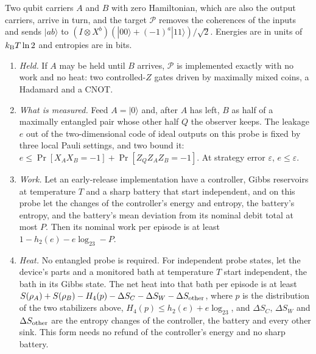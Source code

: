 \begin{proposition}\label{to:prop:certificate}
Two qubit carriers $A$ and $B$ with zero Hamiltonian, which are also the output carriers, arrive in turn, and the target $\mathcal P$ removes the coherences of the inputs and sends $|ab\rangle$ to $(I\otimes X^b)(|00\rangle+(-1)^a|11\rangle)/\sqrt2$. Energies are in units of $k_{\mathrm B} T\ln2$ and entropies are in bits.
\begin{enumerate}[label=(\alph*), leftmargin=*]
\item \emph{Held.} If $A$ may be held until $B$ arrives, $\mathcal P$ is implemented exactly with no work and no heat: two controlled-$Z$ gates driven by maximally mixed coins, a Hadamard and a CNOT.
\item \emph{What is measured.} Feed $A=|0\rangle$ and, after $A$ has left, $B$ as half of a maximally entangled pair whose other half $Q$ the observer keeps. The leakage $e$ out of the two-dimensional code of ideal outputs on this probe is fixed by three local Pauli settings, and two bound it: $e\le\Pr[X_AX_B=-1]+\Pr[Z_QZ_AZ_B=-1]$. At strategy error $\varepsilon$, $e\le\varepsilon$.
\item \emph{Work.} Let an early-release implementation have a controller, Gibbs reservoirs at temperature $T$ and a sharp battery that start independent, and on this probe let the changes of the controller's energy and entropy, the battery's entropy, and the battery's mean deviation from its nominal debit total at most $P$. Then its nominal work per episode is at least $1-h_2(e)-e\log_23-P$.
\item \emph{Heat.} No entangled probe is required. For independent probe states, let the device's parts and a monitored bath at temperature $T$ start independent, the bath in its Gibbs state. The net heat into that bath per episode is at least $S(\rho_A)+S(\rho_B)-H_4(p)-\Delta S_C-\Delta S_W-\Delta S_{\rm other}$, where $p$ is the distribution of the two stabilizers above, $H_4(p)\le h_2(e)+e\log_23$, and $\Delta S_C$, $\Delta S_W$ and $\Delta S_{\rm other}$ are the entropy changes of the controller, the battery and every other sink. This form needs no refund of the controller's energy and no sharp battery.
\end{enumerate}
\end{proposition}

